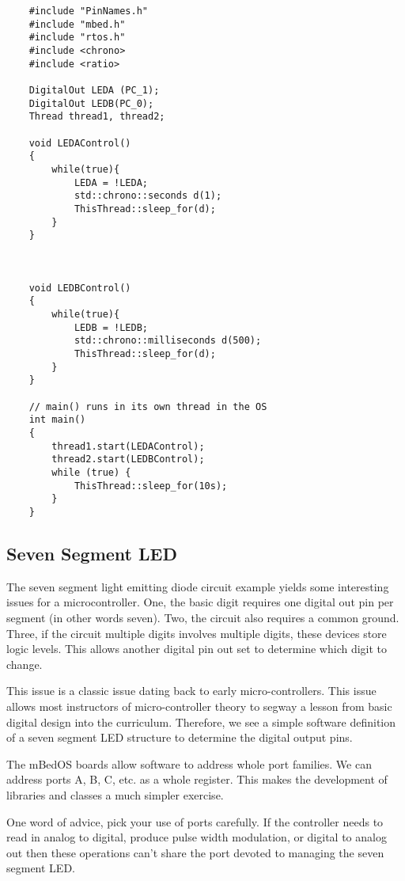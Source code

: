\documentclass{article}
\begin{document}
\begin{lstlisting}
	#include "PinNames.h"
	#include "mbed.h"
	#include "rtos.h"
	#include <chrono>
	#include <ratio>

	DigitalOut LEDA (PC_1);
	DigitalOut LEDB(PC_0);
	Thread thread1, thread2;

	void LEDAControl()
	{
	    while(true){
	        LEDA = !LEDA;
	        std::chrono::seconds d(1);
	        ThisThread::sleep_for(d);
	    }
	}



	void LEDBControl()
	{
	    while(true){
	        LEDB = !LEDB;
	        std::chrono::milliseconds d(500);
	        ThisThread::sleep_for(d);
	    }
	}

	// main() runs in its own thread in the OS
	int main()
	{
	    thread1.start(LEDAControl);
	    thread2.start(LEDBControl);
	    while (true) {
	        ThisThread::sleep_for(10s);
	    }
	}
\end{lstlisting}


\subsection{Seven Segment LED} %
\label{sub:seven_segment_led}

The seven segment light emitting diode circuit example yields some interesting issues for a microcontroller.  One, the basic digit requires one digital out pin per segment (in other words seven).   Two, the circuit also requires a common ground.  Three, if the circuit multiple digits involves multiple digits, these devices store logic levels.  This allows another digital pin out set to determine which digit to change.  

This issue is a classic issue dating back to early micro-controllers.  This issue allows most instructors of micro-controller theory to segway a lesson from basic digital design into the curriculum.  Therefore, we see a simple software definition of a seven segment LED structure to determine the digital output pins.

The mBedOS boards allow software to address whole port families.  We can address ports A, B, C, etc. as a whole register.  This makes the development of libraries and classes a much simpler exercise.  

One word of advice, pick your use of ports carefully.  If the controller needs to read in analog to digital, produce pulse width modulation, or digital to analog out then these operations can't share the port devoted to managing the seven segment LED.
\end{document}
